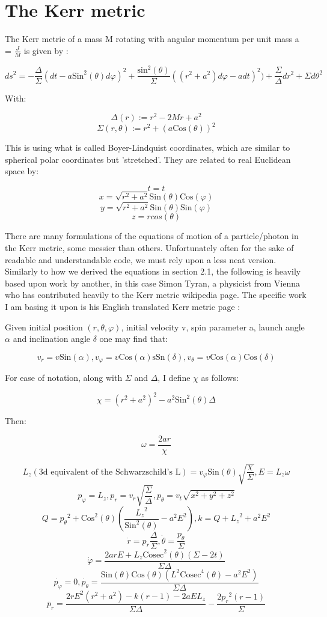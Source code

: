 \documentclass[oneside,openright,frontopenright]{dmathesis}
\begin{document}
\section{The Kerr metric}

	The Kerr metric of a mass M rotating with angular momentum per unit mass a = $\frac{J}{M}$ is given by \cite{raquepas2017topics}:

	\[{ds^{2} = -\frac{\Delta}{\Sigma}(dt-a\mbox{Sin}^2(\theta)d\varphi)^2+\frac{\mbox{sin}^2(\theta)}{\Sigma}((r^2+a^2)d\varphi-adt)^2)+\frac{\Sigma}{\Delta}dr^2+\Sigma d\theta^2}\]

	With:
	
	\[\Delta(r) := r^2 - 2Mr + a^2\]
	\[\Sigma(r, \theta) := r^2 +(a\mbox{Cos}(\theta))^2\]

	This is using what is called Boyer-Lindquist coordinates, which are similar to spherical polar coordinates but 'stretched'. They are related to real Euclidean space by:

	\[t=t\]
	\[x = \sqrt{r^2+a^2}\mbox{Sin}(\theta)\mbox{Cos}(\varphi)\]
	\[y = \sqrt{r^2+a^2}\mbox{Sin}(\theta)\mbox{Sin}(\varphi)\]
	\[z = rcos(\theta)\]

	There are many formulations of the equations of motion of a particle/photon in the Kerr metric, some messier than others. Unfortunately often for the sake of readable and understandable code, we must rely upon a less neat version. Similarly to how we derived the equations in section 2.1, the following is heavily based upon work by another, in this case Simon Tyran, a physicist from Vienna who has contributed heavily to the Kerr metric wikipedia page. The specific work I am basing it upon is his English translated Kerr metric page \cite{yukterezKerr}:

	Given initial position $(r, \theta, \varphi)$, initial velocity v, spin parameter a, launch angle $\alpha$ and inclination angle $\delta$ one may find that:
	
	\[v_r = v\mbox{Sin}(\alpha), v_\varphi = v\mbox{Cos}(\alpha)\mbox{sSn}(\delta), v_\theta = v\mbox{Cos}(\alpha)\mbox{Cos}(\delta)\]

	For ease of notation, along with $\Sigma$ and $\Delta$, I define $\chi$ as follows:

	\[\chi = (r^2+a^2)^2-a^2\mbox{Sin}^2(\theta)\Delta\]

	Then:

	\[\omega = \frac{2ar}{\chi}\]

	\[L_{z} (\mbox{3d equivalent of the Schwarzschild's L}) = v_{\varphi}\mbox{Sin}(\theta)\sqrt{\frac{\chi}{\Sigma}}, E = L_{z}\omega\]
	\[p_{\varphi} = L_{z}, p_{r} = v_{r}\sqrt{\frac{\Sigma}{\Delta}}, p_{\theta} = v_{t}\sqrt{x^2+y^2+z^2}\]
	\[Q = {p_{\theta}}^2+\mbox{Cos}^2(\theta)\left(\frac{{L_{z}}^2}{\mbox{Sin}^2(\theta)}-a^2E^2\right), k = Q+{L_{z}}^2+a^2E^2\]
	\[\dot{r} = p_r\frac{\Delta}{\Sigma}, \dot{\theta} = \frac{p_\theta}{\Sigma}\]
	\[\dot{\varphi} = \frac{2arE+L_{z}\mbox{Cosec}^2(\theta)(\Sigma-2t)}{\Sigma\Delta}\]
	\[\dot{p_{\varphi}} = 0, \dot{p_{\theta}} = \frac{\mbox{Sin}(\theta)\mbox{Cos}(\theta)(L^2\mbox{Cosec}^4(\theta)-a^2E^2)}{\Sigma\Delta}\]
	\[\dot{p_{r}} = \frac{2rE^2(r^2+a^2)-k(r-1)-2aEL_{z}}{\Sigma\Delta}-\frac{2{p_{r}}^2(r-1)}{\Sigma}\]

\appendix
%
%


{}
\end{document}
